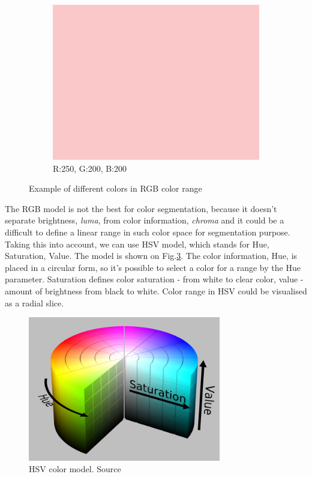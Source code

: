 \documentclass{ctuthesis}
\begin{document}
\begin{figure}[htbp]
\begin{subfigure}{0.3\textwidth}
         \centering
         \includegraphics[width=\textwidth]{250-200-200.png}
         \caption{R:250, G:200, B:200}
         \label{fig: rgb c}
     \end{subfigure}


        \caption{Example of different colors in RGB color range}
        \label{fig: rgb-example}
\end{figure}


The RGB model is not the best for color segmentation, because it doesn't separate brightness, \emph{luma}, from color information, \emph{chroma} and it could be a difficult to define a linear range in such color space for segmentation purpose. Taking this into account, we can use HSV model, which stands for Hue, Saturation, Value. The model is shown on Fig.\ref{fig:2-3}. The color information, Hue, is placed in a circular form, so it's possible to select a color for a range by the Hue parameter. Saturation defines color saturation - from white to clear color, value - amount of brightness from black to white. Color range in HSV could be visualised as a radial slice.

\begin{figure}[htbp]
    \centering
    \includegraphics[width=0.75\textwidth]{800px-HSV_color_solid_cylinder_saturation_gray.png}
    \caption{HSV color model. Source \cite{hsvcolormodel}}
    \label{fig:2-3}
\end{figure}
\end{document}
